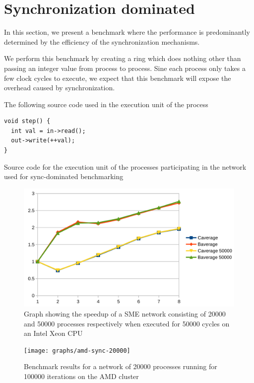 \section{Synchronization dominated}
In this section, we present a benchmark where the performance is
predominantly determined by the efficiency of the synchronization
mechanisms.

We perform this benchmark by creating a ring which does nothing other
than passing an integer value from process to process. Sine each
process only takes a few clock cycles to execute, we expect that this
benchmark will expose the overhead caused by synchronization.

The following source code used in the execution unit of the process
\begin{listing}
\begin{verbatim}
void step() {
  int val = in->read();
  out->write(++val);
}
\end{verbatim}

\caption{Source code for the execution unit of the processes
  participating in the network used for sync-dominated benchmarking}
\end{listing}

\begin{figure}
\centering
\includegraphics[width=\textwidth]{graphs/graphone}
\caption[Benchmark graph]{Graph showing the speedup of a SME network
  consisting of 20000 and 50000 processes respectively when executed
  for 50000 cycles on an Intel Xeon CPU}
\label{fig:intel-sync}
\end{figure}

\begin{figure}
\centering
\texttt{[image: graphs/amd-sync-20000]}
\caption[Synchronization-dominated benchmark on AMD cluster]{Benchmark results for a network of 20000 processes running
for 100000 iterations on the AMD cluster}
\label{fig:amd-sync}
\end{figure}


